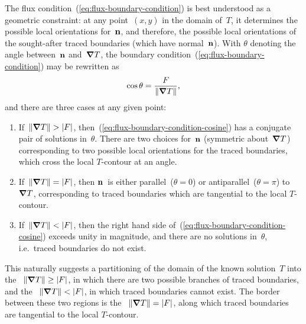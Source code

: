 The flux condition~(\ref{eq:flux-boundary-condition})
is best understood as a geometric constraint:
at any point~$(x, y)$ in the domain of~$T$,
it determines the possible local orientations for~$\mathop{}\!\boldsymbol{\mathbf{n}}$,
and therefore, the possible local orientations
of the sought-after traced boundaries
(which have normal~$\mathop{}\!\boldsymbol{\mathbf{n}}$).
With $\theta$ denoting the angle between~$\mathop{}\!\boldsymbol{\mathbf{n}}$ and~$\mathop{}\!\boldsymbol{\mathbf{\nabla}} T$,
the boundary condition~(\ref{eq:flux-boundary-condition}) may be rewritten as
\begin{equation}
  \cos\theta = \frac{F}{\lVert\mathop{}\!\boldsymbol{\mathbf{\nabla}} T\rVert},
  \label{eq:flux-boundary-condition-cosine}
\end{equation}
and there are three cases at any given point:
\begin{enumerate}
  \item
    If~$\lVert\mathop{}\!\boldsymbol{\mathbf{\nabla}} T\rVert > \lvert F\rvert$,
    then~(\ref{eq:flux-boundary-condition-cosine})
    has a conjugate pair of solutions in~$\theta$.
    There are two choices for~$\mathop{}\!\boldsymbol{\mathbf{n}}$
    (symmetric about~$\mathop{}\!\boldsymbol{\mathbf{\nabla}} T$)
    corresponding to two possible local orientations
    for the traced boundaries,
    which cross the local $T$-contour at an angle.
  \item
    If~$\lVert\mathop{}\!\boldsymbol{\mathbf{\nabla}} T\rVert = \lvert F\rvert$,
    then $\mathop{}\!\boldsymbol{\mathbf{n}}$~is either parallel~($\theta = 0$)
    or antiparallel~($\theta = \pi$) to~$\mathop{}\!\boldsymbol{\mathbf{\nabla}} T$,
    corresponding to traced boundaries which are tangential
    to the local $T$-contour.
  \item
    If~$\lVert\mathop{}\!\boldsymbol{\mathbf{\nabla}} T\rVert < \lvert F\rvert$,
    then the right hand side of~(\ref{eq:flux-boundary-condition-cosine})
    exceeds unity in magnitude,
    and there are no solutions in~$\theta$,
    i.e.~traced boundaries do not exist.
\end{enumerate}
This naturally suggests a partitioning of
the domain of the known solution~$T$ into
the ~$\lVert\mathop{}\!\boldsymbol{\mathbf{\nabla}} T\rVert \ge \lvert F\rvert$,
in which there are two possible branches of traced boundaries,
and the ~$\lVert\mathop{}\!\boldsymbol{\mathbf{\nabla}} T\rVert < \lvert F\rvert$,
in which traced boundaries cannot exist.
The border between these two regions is
the ~$\lVert\mathop{}\!\boldsymbol{\mathbf{\nabla}} T\rVert = \lvert F\rvert$,
along which traced boundaries are tangential to the local $T$-contour.

